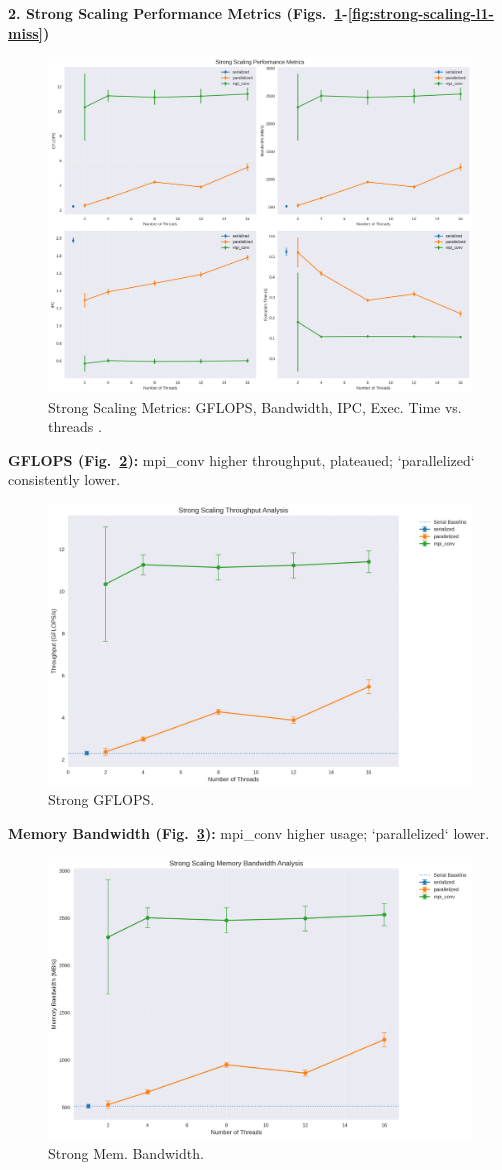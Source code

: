 \documentclass[conference, 10pt]{IEEEtran}
\begin{document}
\textbf{2. Strong Scaling Performance Metrics (Figs.~\ref{fig:strong-scaling-metrics-all}-\ref{fig:strong-scaling-l1-miss})}
\begin{figure}[H]
    \centering
    \includegraphics[width=0.9\linewidth]{figures/strong_scaling_metrics.png}
    \caption{Strong Scaling Metrics: GFLOPS, Bandwidth, IPC, Exec. Time vs. threads \cite{Wang2023}.}
    \label{fig:strong-scaling-metrics-all}
\end{figure}
    \textbf{GFLOPS (Fig.~\ref{fig:strong-scaling-gflops}):} mpi\_conv higher throughput, plateaued; `parallelized` consistently lower.
\begin{figure}[H] \centering \includegraphics[width=0.7\linewidth]{figures/gflops_vs_threads.png} \caption{Strong GFLOPS.}\label{fig:strong-scaling-gflops}\end{figure}
    \textbf{Memory Bandwidth (Fig.~\ref{fig:strong-scaling-mem-bw}):} mpi\_conv higher usage; `parallelized` lower.
\begin{figure}[H] \centering \includegraphics[width=0.7\linewidth]{figures/mem_bandwidth_vs_threads.png} \caption{Strong Mem. Bandwidth.}\label{fig:strong-scaling-mem-bw}\end{figure}
\end{document}
